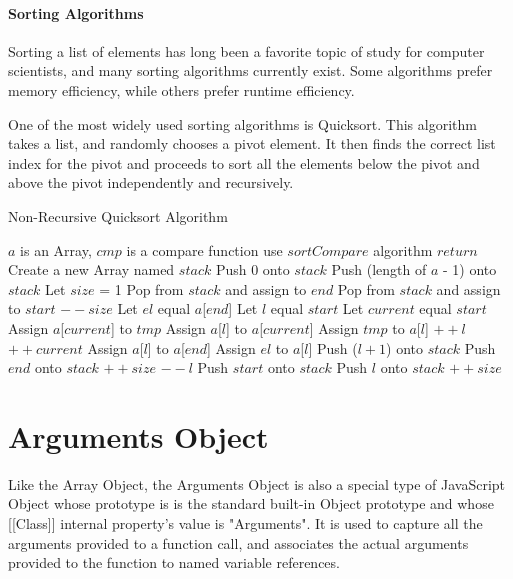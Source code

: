 \documentclass[a4paper,11pt,twoside]{report}
\begin{document}
\subsubsection{Sorting Algorithms}
Sorting a list of elements has long been a favorite topic of study for computer scientists, and many sorting algorithms currently exist. Some algorithms prefer memory efficiency, while others prefer runtime efficiency. 

One of the most widely used sorting algorithms is Quicksort. This algorithm takes a list, and randomly chooses a pivot element. It then finds the correct list index for the pivot and proceeds to sort all the elements below the pivot and above the pivot independently and recursively.

\begin{algorithm}
\caption{Non-Recursive Quicksort Algorithm}
\begin{algorithmic}
\REQUIRE $a$ is an Array, $cmp$ is a compare function
\STATE use $sortCompare$ algorithm
\ENDIF
{}
\STATE $return$
\ENDIF
\STATE Create a new Array named $stack$
\STATE Push 0 onto $stack$
\STATE Push (length of $a$ - 1) onto $stack$
\STATE Let $size$ = 1
\STATE Pop from $stack$ and assign to $end$
\STATE Pop from $stack$ and assign to $start$
\STATE $--size$
\STATE Let $el$ equal $a$[$end$]
\STATE Let $l$ equal $start$
\STATE Let $current$ equal $start$
\STATE Assign $a$[$current$] to $tmp$
\STATE Assign $a$[$l$] to $a$[$current$]
\STATE Assign $tmp$ to $a$[$l$]
\STATE $++l$
\ENDIF
\STATE $++current$
\ENDWHILE
\STATE Assign $a$[$l$] to $a$[$end$]
\STATE Assign $el$ to $a$[$l$]
\STATE Push ($l + 1$) onto $stack$
\STATE Push $end$ onto $stack$
\STATE $++size$
\ENDIF
\STATE $--l$
\STATE Push $start$ onto $stack$
\STATE Push $l$ onto $stack$
\STATE $++size$
\ENDIF
\ENDWHILE
\end{algorithmic}
\end{algorithm}


\chapter{Arguments Object}
Like the Array Object, the Arguments Object is also a special type of JavaScript Object whose prototype is is the standard built-in Object prototype and whose [[Class]] internal property's value is "Arguments". It is used to capture all the arguments provided to a function call, and associates the actual arguments provided to the function to named variable references. 
\end{document}
